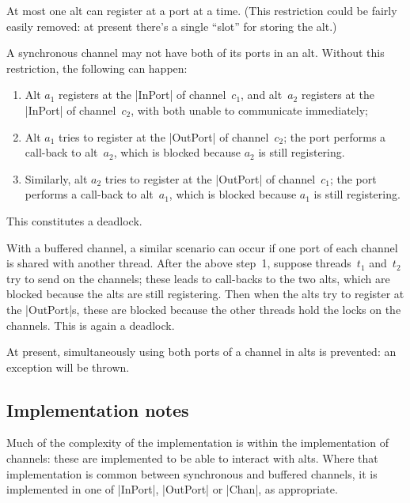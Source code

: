 \documentclass[12pt,a4paper]{article}
\begin{document}
At most one alt can register at a port at a time.  (This restriction could be
fairly easily removed: at present there's a single ``slot'' for storing the
alt.)


A synchronous channel may not have both of its ports in an alt.  Without this
restriction, the following can happen: 
\begin{enumerate}
\item Alt $a_1$ registers at the |InPort| of channel~$c_1$, and alt~$a_2$
  registers at the |InPort| of channel~$c_2$, with both unable to communicate
  immediately;

\item Alt $a_1$ tries to register at the |OutPort| of channel~$c_2$; the port
  performs a call-back to alt~$a_2$, which is blocked because $a_2$ is still
  registering.

\item Similarly, alt $a_2$ tries to register at the |OutPort| of
  channel~$c_1$; the port performs a call-back to alt~$a_1$, which is blocked
  because $a_1$ is still registering.
\end{enumerate}
%
This constitutes a deadlock. 

With a buffered channel, a similar scenario can occur if one port of each
channel is shared with another thread.  After the above step~1, suppose
threads~$t_1$ and~$t_2$ try to send on the channels; these leads to call-backs
to the two alts, which are blocked because the alts are still registering.
Then when the alts try to register at the |OutPort|s, these are blocked
because the other threads hold the locks on the channels.  This is again a
deadlock. 

At present, simultaneously using both ports of a channel in alts is prevented:
an exception will be thrown.




\subsection*{Implementation notes}

Much of the complexity of the implementation is within the implementation of
channels: these are implemented to be able to interact with alts.  Where that
implementation is common between synchronous and buffered channels, it is
implemented in one of |InPort|, |OutPort| or |Chan|, as appropriate.  

 
\end{document}
